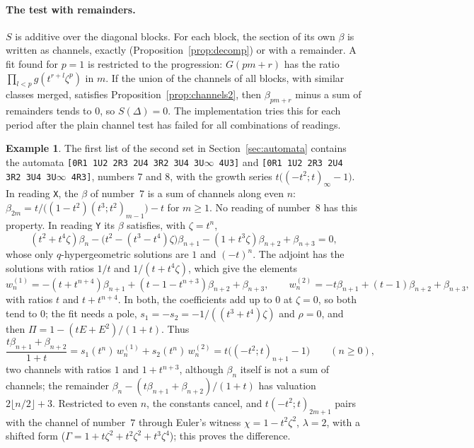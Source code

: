 \documentclass[11pt,a4paper]{article}
\theoremstyle{plain}
\theoremstyle{definition}
\newtheorem{example}[theorem]{Example}
\theoremstyle{remark}
\begin{document}
\paragraph{The test with remainders.} $S$ is additive over the diagonal blocks.
For each block, the section of its own $\beta$ is written as channels, exactly
(Proposition~\ref{prop:decomp}) or with a remainder. A fit found for $p=1$ is
restricted to the progression: $G(pm+r)$ has the ratio
$\prod_{l<p}g(t^{r+l}\zeta^p)$ in $m$. If the union of the channels of all
blocks, with similar classes merged, satisfies
Proposition~\ref{prop:channels2}, then $\beta_{pm+r}$ minus a sum of remainders
tends to $0$, so $S(\Delta)=0$. The implementation tries this for each period
after the plain channel test has failed for all combinations of readings.

\begin{example}\label{ex:sum-side}
The first list of the second set in Section~\ref{sec:automata} contains the
automata \texttt{[0R1 1U2 2R3 2U4 3R2 3U4 3U$\infty$ 4U3]} and
\texttt{[0R1 1U2 2R3 2U4 3R2 3U4 3U$\infty$ 4R3]}, numbers $7$ and $8$, with the
growth series $t\bigl((-t^2;t)_\infty-1\bigr)$. In reading \texttt{X}, the
$\beta$ of number~$7$ is a sum of channels along even $n$:
$\beta_{2m}=t/\bigl((1-t^2)(t^3;t^2)_{m-1}\bigr)-t$ for $m\ge1$. No reading of
number~$8$ has this property. In reading \texttt{Y} its $\beta$ satisfies, with $\zeta=t^n$,
\[
  (t^2+t^4\zeta)\beta_n-\bigl(t^2-(t^3-t^4)\zeta\bigr)\beta_{n+1}-(1+t^3\zeta)\beta_{n+2}+\beta_{n+3}=0,
\]
whose only $q$-hypergeometric solutions are $1$ and $(-t)^n$. The adjoint has the
solutions with ratios $1/t$ and $1/(t+t^4\zeta)$, which give the elements
\[
  w^{(1)}_n=-(t+t^{n+4})\beta_{n+1}+(t-1-t^{n+3})\beta_{n+2}+\beta_{n+3},\qquad
  w^{(2)}_n=-t\beta_{n+1}+(t-1)\beta_{n+2}+\beta_{n+3},
\]
with ratios $t$ and $t+t^{n+4}$. In both, the coefficients add up to $0$ at
$\zeta=0$, so both tend to $0$; the fit needs a pole, $s_1=-s_2=-1/((t^3+t^4)\zeta)$
and $\rho=0$, and then $\Pi=1-(tE+E^2)/(1+t)$. Thus
\[
  \frac{t\beta_{n+1}+\beta_{n+2}}{1+t}=s_1(t^n)\,w^{(1)}_n+s_2(t^n)\,w^{(2)}_n
  =t\bigl((-t^2;t)_{n+1}-1\bigr)\qquad(n\ge0),
\]
two channels with ratios $1$ and $1+t^{n+3}$, although $\beta_n$ itself is not a
sum of channels; the remainder $\beta_n-(t\beta_{n+1}+\beta_{n+2})/(1+t)$ has
valuation $2\lfloor n/2\rfloor+3$. Restricted to even $n$, the constants
cancel, and $t(-t^2;t)_{2m+1}$ pairs with the channel of number~$7$ through
Euler's witness $\chi=1-t^2\zeta^2$, $\lambda=2$, with a shifted form
($\Gamma=1+t\zeta^2+t^2\zeta^2+t^3\zeta^4$); this proves the difference.
\end{example}
\end{document}
